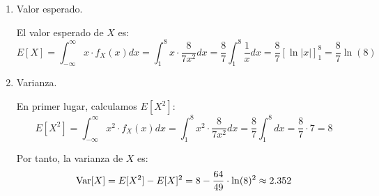 \begin{ejercicio}
\begin{enumerate}
        \item Valor esperado.
        
        El valor esperado de $X$ es:
        \begin{equation*}
            E[X] = \int_{-\infty}^{\infty}x\cdot f_X(x)dx = \int_{1}^{8}x\cdot \frac{8}{7x^2}dx = \dfrac{8}{7}\int_{1}^{8}\frac{1}{x}dx = \dfrac{8}{7}\left[\ln|x|\right]_{1}^{8} = \dfrac{8}{7}\ln(8)
        \end{equation*}

        \item Varianza.
        
        En primer lugar, calculamos $E[X^2]$:
        \begin{equation*}
            E[X^2] = \int_{-\infty}^{\infty}x^2\cdot f_X(x)dx = \int_{1}^{8}x^2\cdot \frac{8}{7x^2}dx = \dfrac{8}{7}\int_{1}^{8}dx = \dfrac{8}{7}\cdot 7 = 8
        \end{equation*}

        Por tanto, la varianza de $X$ es:
        \begin{equation*}
            \operatorname{Var}[X] = E[X^2] - E[X]^2 = 8 - \dfrac{64}{49}\cdot \ln(8)^2 \approx 2.352
        \end{equation*}
    \end{enumerate}
\end{ejercicio}


